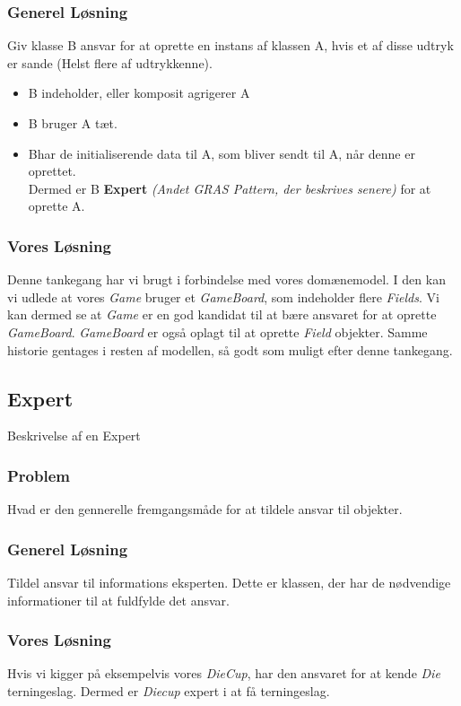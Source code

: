 \subsubsection*{Generel Løsning}
Giv klasse B ansvar for at oprette en instans af klassen A, hvis et af disse udtryk er sande (Helst flere af udtrykkenne).
\begin{itemize}
\item B indeholder, eller komposit agrigerer A
\item B bruger A tæt.
\item Bhar de initialiserende data til A, som bliver sendt til A, når denne er oprettet.
\\
Dermed er B \textbf{Expert} \textit{(Andet GRAS Pattern, der beskrives senere)} for at oprette A.
\end{itemize}
\subsubsection*{Vores Løsning}
Denne tankegang har vi brugt i forbindelse med vores domænemodel. I den kan vi udlede at vores \textit{Game} bruger et \textit{GameBoard}, som indeholder flere \textit{Fields}. Vi kan dermed se at \textit{Game} er en god kandidat til at bære ansvaret for at oprette \textit{GameBoard}. \textit{GameBoard} er også oplagt til at oprette \textit{Field} objekter. Samme historie gentages i resten af modellen, så godt som muligt efter denne tankegang.
\subsection{Expert}
Beskrivelse af en Expert
\subsubsection*{Problem}
Hvad er den gennerelle fremgangsmåde for at tildele ansvar til objekter.
\subsubsection*{Generel Løsning}
Tildel ansvar til informations eksperten. Dette er klassen, der har de nødvendige informationer til at fuldfylde det ansvar.
\subsubsection*{Vores Løsning}
Hvis vi kigger på eksempelvis vores \textit{DieCup}, har den ansvaret for at kende \textit{Die} terningeslag. Dermed er \textit{Diecup} expert i at få terningeslag.
